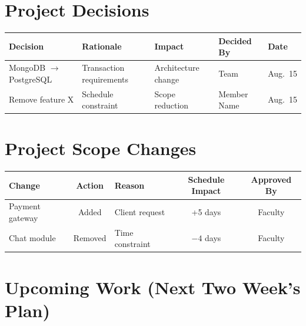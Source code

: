 \documentclass[11pt,a4paper]{article}
\begin{document}
\section{Project Decisions}

\begin{table}[htbp]
\centering
\label{tab:project-decisions}
\renewcommand{\arraystretch}{1.3}

\begin{tabular}{>{\raggedright\arraybackslash}p{3.2cm}
                >{\raggedright\arraybackslash}p{4.0cm}
                >{\raggedright\arraybackslash}p{3.5cm}
                >{\centering\arraybackslash}p{2.0cm}
                >{\centering\arraybackslash}p{1.5cm}}
\toprule
\textbf{Decision} &
\textbf{Rationale} &
\textbf{Impact} &
\textbf{Decided By} &
\textbf{Date} \\
\midrule

MongoDB $\rightarrow$ PostgreSQL &
Transaction requirements &
Architecture change &
Team &
Aug.\ 15 \\

Remove feature X &
Schedule constraint &
Scope reduction &
Member Name &
Aug.\ 15 \\

\bottomrule
\end{tabular}
\end{table}

\section{Project Scope Changes}

\begin{table}[htbp]
\centering
\label{tab:scope-changes}
\renewcommand{\arraystretch}{1.25}

\begin{tabular}{p{3.0cm} c p{3.2cm} c c}
\toprule
\textbf{Change} &
\textbf{Action} &
\textbf{Reason} &
\textbf{Schedule Impact} &
\textbf{Approved By} \\
\midrule

Payment gateway &
Added &
Client request &
+5 days &
Faculty \\

Chat module &
Removed &
Time constraint &
$-4$ days &
Faculty \\

\bottomrule
\end{tabular}
\end{table}

\section{Upcoming Work (Next Two Week's Plan)}
\end{document}
